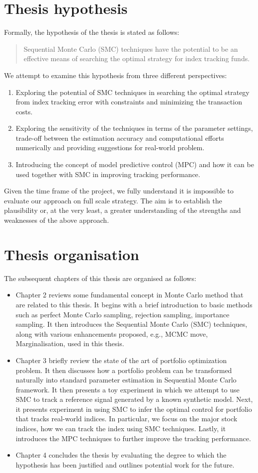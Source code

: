 \section{Thesis hypothesis}
Formally, the hypothesis of the thesis is stated as follows:
\begin{quote}
Sequential Monte Carlo (SMC) techniques have the potential to be an effective means of searching the optimal strategy for index tracking funds.
\end{quote}
We attempt to examine this hypothesis from three different perspectives:
\begin{enumerate}
\item Exploring the potential of SMC techniques in searching the optimal strategy from index tracking error with constraints and minimizing the transaction costs.
\item Exploring the sensitivity of the techniques in terms of the parameter settings, trade-off between the estimation accuracy and computational efforts numerically and providing suggestions for real-world problem.
\item Introducing the concept of model predictive control (MPC) and how it can be used together with SMC in improving tracking performance.
\end{enumerate}
Given the time frame of the project, we fully understand it is impossible to evaluate our approach on full scale strategy. The aim is to establish the plausibility or, at the very least, a greater understanding of the strengths and weaknesses of the above approach.

\section{Thesis organisation}
The subsequent chapters of this thesis are organised as follows:
\begin{itemize}
\item Chapter 2 reviews some fundamental concept in Monte Carlo method that are related to this thesis. It begins with a brief introduction to basic methods such as perfect Monte Carlo sampling, rejection sampling, importance sampling. It then  introduces the Sequential Monte Carlo (SMC) techniques, along with various enhancements proposed, e.g., MCMC move, Marginalisation, used in this thesis.
\item Chapter 3 briefly review the state of the art of portfolio optimization problem. It then discusses how a portfolio problem can be transformed naturally into standard parameter estimation in Sequential Monte Carlo framework.
It then presents a toy experiment in which we attempt to use SMC to track a reference signal generated by a known synthetic model. Next, it presents experiment in using SMC to infer the optimal control for portfolio that tracks real-world indices. In particular, we focus on the major stock indices, how we can track the index using SMC techniques. Lastly, it introduces the MPC techniques to further improve the tracking performance.
\item Chapter 4 concludes the thesis by evaluating the degree to which the hypothesis has been justified and outlines potential work for the future.
\end{itemize}



